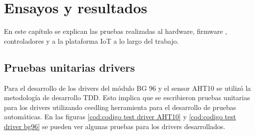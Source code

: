 
\chapter{Ensayos y resultados} %
En este capítulo se explican las pruebas realizadas al hardware, firmware , controladores y a la plataforma IoT a lo largo del trabajo.
\label{Chapter4} %


\section{Pruebas unitarias drivers}
Para el desarrollo de los drivers del módulo BG 96 y el sensor AHT10 se utilizó la metodología de desarrollo TDD. Esto implica que se escribieron pruebas unitarias para los drivers utilizando ceedling herramienta para el desarrollo de pruebas automáticas. En las figuras \ref{cod:codigo test driver AHT10} y \ref{cod:codigo test driver bg96} se pueden ver algunas pruebas para los drivers desarrollados.
